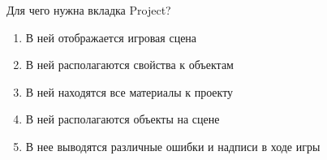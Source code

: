 
Для чего нужна вкладка Project?

\begin{enumerate}
    \item В ней отображается игровая сцена
    \item В ней располагаются свойства к объектам
    \item В ней находятся все материалы к проекту
    \item В ней располагаются объекты на сцене
    \item В нее выводятся различные ошибки и надписи в ходе игры
\end{enumerate}

